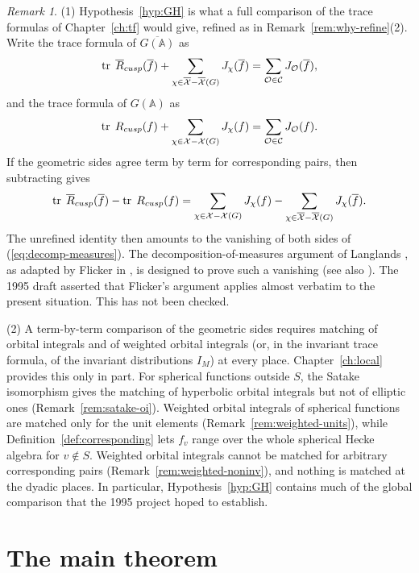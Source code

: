 \documentclass[12pt,letterpaper]{book}
\theoremstyle{plain}
\theoremstyle{definition}
\theoremstyle{remark}
\newtheorem{remark}[theorem]{Remark}
\theoremstyle{remark}
\newcommand{\tr}{\operatorname{tr}}
\begin{document}
\begin{remark}\label{rem:GH}
(1) Hypothesis~\ref{hyp:GH} is what a full comparison of the trace
formulas of Chapter~\ref{ch:tf} would give, refined as in
Remark~\ref{rem:why-refine}(2). Write the trace formula of
$\overline{G({\mathbb{A}})}$ as
\[
\tr \;\overline{R}_{cusp}(\overline{f})+
\sum_{\chi \in \overline{{\cal X}}-\overline{{\cal X}}(G)}
J_\chi (\overline{f}) =\sum_{{\cal O}\in {\cal C}}J_{{\cal O}}(\overline{f}),
\]
and the trace formula of $G({\mathbb{A}})$ as
\[
\tr \;R_{cusp}(f)+
\sum_{\chi \in {\cal X}-{\cal X}(G)}J_\chi(f)
=\sum_{{\cal O}\in {\cal C}}J_{{\cal O}}(f).
\]
If the geometric sides agree term by term for corresponding pairs, then
subtracting gives
\begin{equation}\label{eq:decomp-measures}
\tr \;\overline{R}_{cusp}(\overline{f})-\tr \;R_{cusp}(f)
=\sum_{\chi \in {\cal X}-{\cal X}(G)}J_\chi (f)
-\sum_{\chi \in \overline{{\cal X}}-\overline{{\cal X}}(G)}
J_\chi(\overline{f}).
\end{equation}
The unrefined identity then amounts to the vanishing of both sides
of (\ref{eq:decomp-measures}). The decomposition-of-measures argument
of Langlands \cite{L4}, as adapted by Flicker in \cite[\S\S 4.1--4.2]{Fl}, is
designed to prove such a vanishing (see also \cite[\S\S 10.5,
14.5]{R}). The 1995 draft asserted that Flicker's argument applies almost
verbatim to the present situation. This has not been checked.

(2) A term-by-term comparison of the geometric sides requires matching
of orbital integrals and of weighted orbital integrals (or, in the
invariant trace formula, of the invariant distributions $I_M$) at every
place. Chapter~\ref{ch:local} provides this only in part. For spherical
functions outside $S$, the Satake isomorphism gives the matching of
hyperbolic orbital integrals but not of elliptic ones
(Remark~\ref{rem:satake-oi}). Weighted orbital integrals of spherical
functions are matched only for the unit elements
(Remark~\ref{rem:weighted-units}), while Definition~\ref{def:corresponding}
lets $f_v$ range over the whole spherical Hecke algebra for $v\notin S$.
Weighted orbital integrals cannot be matched for arbitrary corresponding
pairs (Remark~\ref{rem:weighted-noninv}), and nothing is matched at the
dyadic places. In particular, Hypothesis~\ref{hyp:GH} contains much of
the global comparison that the 1995 project hoped to establish.
\end{remark}

\section{The main theorem}\label{sec:main}
\end{document}
